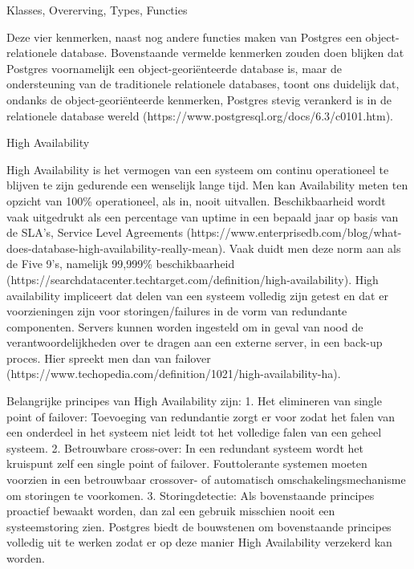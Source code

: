 Klasses, Overerving, Types, Functies

Deze vier kenmerken, naast nog andere functies maken van Postgres een object-relationele database. Bovenstaande vermelde kenmerken zouden doen blijken dat Postgres voornamelijk een object-georiënteerde database is, maar de ondersteuning van de traditionele relationele databases, toont ons duidelijk dat, ondanks de object-georiënteerde kenmerken, Postgres stevig verankerd is in de relationele database wereld (https://www.postgresql.org/docs/6.3/c0101.htm).




High Availability


High Availability is het vermogen van een systeem om continu operationeel te blijven te zijn gedurende een wenselijk lange tijd. Men kan Availability meten ten opzicht van 100\% operationeel, als in, nooit uitvallen. Beschikbaarheid wordt vaak uitgedrukt als een percentage van uptime in een bepaald jaar op basis van de SLA's, Service Level Agreements (https://www.enterprisedb.com/blog/what-does-database-high-availability-really-mean). Vaak duidt men deze norm aan als de Five 9's, namelijk 99,999\% beschikbaarheid (https://searchdatacenter.techtarget.com/definition/high-availability). High availability impliceert dat delen van een systeem volledig zijn getest en dat er voorzieningen zijn voor storingen/failures in de vorm van redundante componenten. Servers kunnen worden ingesteld om in geval van nood de verantwoordelijkheden over te dragen aan een externe server, in een back-up proces. Hier spreekt men dan van failover (https://www.techopedia.com/definition/1021/high-availability-ha).

Belangrijke principes van High Availability zijn:
1. Het elimineren van single point of failover: Toevoeging van redundantie zorgt er voor zodat het falen van een onderdeel in het systeem niet leidt tot het volledige falen van een geheel systeem.
2. Betrouwbare cross-over: In een redundant systeem wordt het kruispunt zelf een single point of failover. Fouttolerante systemen moeten voorzien in een betrouwbaar crossover- of automatisch omschakelingsmechanisme om storingen te voorkomen.
3. Storingdetectie: Als bovenstaande principes proactief bewaakt worden, dan zal een gebruik misschien nooit een systeemstoring zien.
Postgres biedt de bouwstenen om bovenstaande principes volledig uit te werken zodat er op deze manier High Availability verzekerd kan worden.


